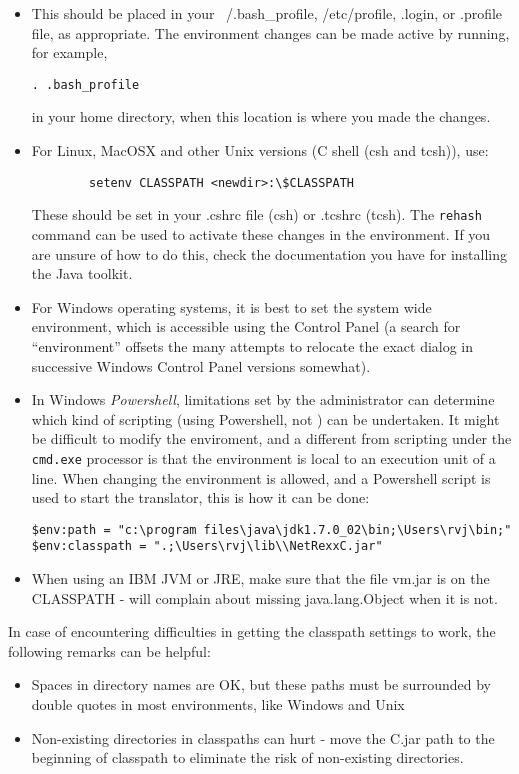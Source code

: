 \begin{itemize}
\item This should be placed
  in your ~/.bash\_profile, /etc/profile, .login, or .profile file, as
  appropriate. The environment changes can be made active by running,
  for example,
\begin{verbatim}
. .bash_profile
\end{verbatim}
in your home directory, when this location is where you made the changes.
\item For Linux, MacOSX and other Unix versions (C shell (csh and tcsh)), use:
\begin{verbatim}
        setenv CLASSPATH <newdir>:\$CLASSPATH 
\end{verbatim}
These should be set in your .cshrc file (csh) or .tcshrc (tcsh). The
\texttt{rehash} command can be used to activate these changes in the environment. If you are unsure of how to do this, check the
documentation you have for installing the Java toolkit.
\item For Windows operating systems, it is best to set the system wide
  environment, which is accessible using the Control Panel (a search
  for ``environment'' offsets the many attempts to relocate the exact
  dialog in successive Windows Control Panel versions somewhat).
\item In Windows \emph{Powershell}, limitations set by the
  administrator can determine which kind of scripting (using
  Powershell, not \nr) can be undertaken. It might be difficult to
  modify the enviroment, and a different from scripting under the
  \texttt{cmd.exe} processor is that the environment is local to an
  execution unit of a line. When changing the environment is allowed,
  and a Powershell script is used to start the \nr translator, this is
  how it can be done:
\begin{verbatim}
$env:path = "c:\program files\java\jdk1.7.0_02\bin;\Users\rvj\bin;"
$env:classpath = ".;\Users\rvj\lib\\NetRexxC.jar"
\end{verbatim}
 \item When using an IBM JVM or JRE, make sure that the file vm.jar is
   on the CLASSPATH - \nr{} will complain about missing
   java.lang.Object when it is not.
\end{itemize}

In case of encountering difficulties in getting the classpath settings
to work, the following remarks can be helpful:
\begin{itemize}
\item Spaces in directory names are OK, but these paths must be
  surrounded by double quotes in most environments, like Windows and
  Unix
\item Non-existing directories in classpaths can hurt - move the
  \nr{}C.jar path to the beginning of classpath to eliminate the
  risk of non-existing directories.
\end{itemize}

